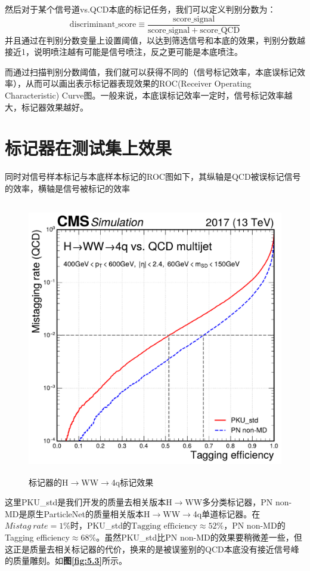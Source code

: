 然后对于某个信号道vs.QCD本底的标记任务，我们可以定义判别分数为：
\begin{equation}
    \text{discriminant}\_\text{score}\equiv\frac{\text{score}\_\text{signal}}{\text{score}\_\text{signal} + \text{score}\_\text{QCD}}
\end{equation}
并且通过在判别分数变量上设置阈值，以达到筛选信号和本底的效果，判别分数越接近1，说明喷注越有可能是信号喷注，反之更可能是本底喷注。

而通过扫描判别分数阈值，我们就可以获得不同的（信号标记效率，本底误标记效率），从而可以画出表示标记器表现效果的ROC(Receiver Operating Characteristic) Curve图。一般来说，本底误标记效率一定时，信号标记效率越大，标记器效果越好。
\section{标记器在测试集上效果}
同时对信号样本标记与本底样本标记的ROC图如下，其纵轴是QCD被误标记信号的效率，横轴是信号被标记的效率
\begin{figure}[H]\label{fig:5.2}
 \centering
 \caption{标记器的H$\to$WW$\to$4q标记效果}
 \includegraphics[height=12cm, width=12cm]{pictures/ROC_HWW_4q.pdf}
\end{figure}
这里PKU\_std是我们开发的质量去相关版本H$\to$WW多分类标记器，PN non-MD是原生ParticleNet的质量相关版本H$\to$WW$\to$4q单道标记器。在$Mistag\ rate=1\%$时，PKU\_std的$\text{Tagging efficiency}\approx52\%$，PN non-MD的Tagging efficiency$\approx68\%$。虽然PKU\_std比PN non-MD的效果要稍微差一些，但这正是质量去相关标记器的代价，换来的是被误鉴别的QCD本底没有接近信号峰的质量雕刻。如\textbf{图\ref{fig:5.3}}所示。

